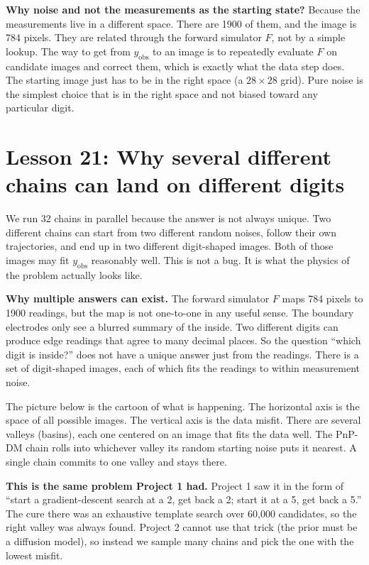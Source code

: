 \documentclass[11pt]{article}
\begin{document}
\textbf{Why noise and not the measurements as the starting state?}
Because the measurements live in a different space. There are 1900 of
them, and the image is 784 pixels. They are related through the forward
simulator $F$, not by a simple lookup. The way to get from $y_{\text{obs}}$
to an image is to repeatedly evaluate $F$ on candidate images and
correct them, which is exactly what the data step does. The starting
image just has to be in the right space (a $28 \times 28$ grid). Pure
noise is the simplest choice that is in the right space and not biased
toward any particular digit.

\section{Lesson 21: Why several different chains can land on different digits}

We run 32 chains in parallel because the answer is not always unique.
Two different chains can start from two different random noises, follow
their own trajectories, and end up in two different digit-shaped images.
Both of those images may fit $y_{\text{obs}}$ reasonably well. This is
not a bug. It is what the physics of the problem actually looks like.

\textbf{Why multiple answers can exist.} The forward simulator $F$ maps
784 pixels to 1900 readings, but the map is not one-to-one in any
useful sense. The boundary electrodes only see a blurred summary of the
inside. Two different digits can produce edge readings that agree to
many decimal places. So the question ``which digit is inside?'' does
not have a unique answer just from the readings. There is a set of
digit-shaped images, each of which fits the readings to within
measurement noise.

The picture below is the cartoon of what is happening. The horizontal
axis is the space of all possible images. The vertical axis is the data
misfit. There are several valleys (basins), each one centered on an
image that fits the data well. The PnP-DM chain rolls into whichever
valley its random starting noise puts it nearest. A single chain
commits to one valley and stays there.

\begin{aside}
\textbf{This is the same problem Project 1 had.} Project 1 saw it in
the form of ``start a gradient-descent search at a 2, get back a 2;
start it at a 5, get back a 5.'' The cure there was an exhaustive
template search over 60{,}000 candidates, so the right valley was
always found. Project 2 cannot use that trick (the prior must be a
diffusion model), so instead we sample many chains and pick the one
with the lowest misfit.
\end{aside}
\end{document}
